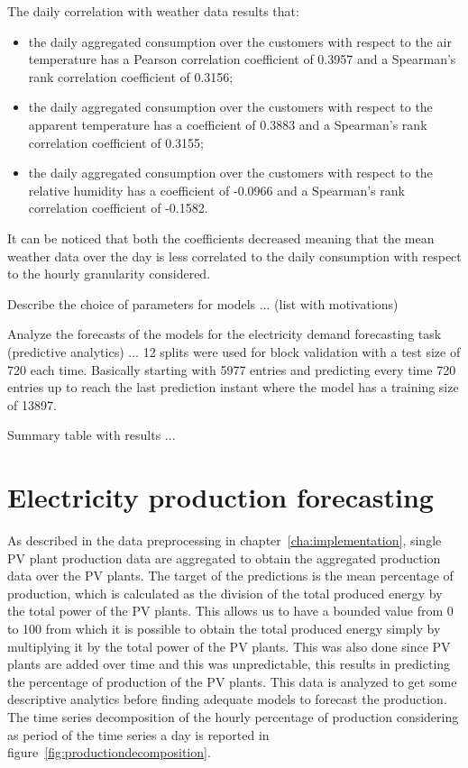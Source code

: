 The daily correlation with weather data results that:
\begin{itemize}
  \item the daily aggregated consumption over the customers with respect to the air temperature has a Pearson correlation coefficient of 0.3957 and a Spearman's rank correlation coefficient of 0.3156;
  \item the daily aggregated consumption over the customers with respect to the apparent temperature has a coefficient of 0.3883 and a Spearman's rank correlation coefficient of 0.3155;
  \item the daily aggregated consumption over the customers with respect to the relative humidity has a coefficient of -0.0966 and a Spearman's rank correlation coefficient of -0.1582.
\end{itemize}
It can be noticed that both the coefficients decreased meaning that the mean weather data over the day is less correlated to the daily consumption with respect to the hourly granularity considered.

Describe the choice of parameters for models ... (list with motivations)

Analyze the forecasts of the models for the electricity demand forecasting task (predictive analytics) ...
12 splits were used for block validation with a test size of 720 each time.
Basically starting with 5977 entries and predicting every time 720 entries up to reach the last prediction instant where the model has a training size of 13897.

Summary table with results ...


\section{Electricity production forecasting}
\label{sec:productionval}
\vspace{0.2 cm}

As described in the data preprocessing in chapter~\ref{cha:implementation}, single PV plant production data are aggregated to obtain the aggregated production data over the PV plants.
The target of the predictions is the mean percentage of production, which is calculated as the division of the total produced energy by the total power of the PV plants.
This allows us to have a bounded value from 0 to 100 from which it is possible to obtain the total produced energy simply by multiplying it by the total power of the PV plants.
This was also done since PV plants are added over time and this was unpredictable, this results in predicting the percentage of production of the PV plants.
This data is analyzed to get some descriptive analytics before finding adequate models to forecast the production.
The time series decomposition of the hourly percentage of production considering as period of the time series a day is reported in figure~\ref{fig:productiondecomposition}. %

